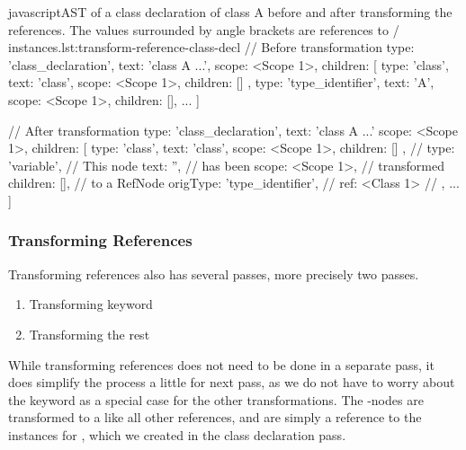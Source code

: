 \begin{code}{javascript}{AST of a class declaration of class A before and after transforming the references. The values surrounded by angle brackets are references to / instances.}{lst:transform-reference-class-decl}
    // Before transformation
    {
        type: 'class_declaration',
        text: 'class A ...',
        scope: <Scope 1>,
        children: [
            {
                type: 'class',
                text: 'class',
                scope: <Scope 1>,
                children: []
            }, {
                type: 'type_identifier',
                text: 'A',
                scope: <Scope 1>,
                children: [],
            }
            ...
        ]
    }

    // After transformation
    {
        type: 'class_declaration',
        text: 'class A ...'
        scope: <Scope 1>,
        children: [
            {
                type: 'class',
                text: 'class',
                scope: <Scope 1>,
                children: []
            }, {                                //
                type: 'variable',               // This node
                text: '',                       // has been
                scope: <Scope 1>,               // transformed
                children: [],                   // to a RefNode
                origType: 'type_identifier',    //
                ref: <Class 1>                  //
            },
            ...
        ]
    }
\end{code}

\subsubsection{Transforming References}

Transforming references also has several passes, more precisely two passes.

\begin{enumerate}
    \item Transforming  keyword
    \item Transforming the rest
\end{enumerate}

While transforming  references does not need to be done in a separate pass, it does simplify the process a little for next pass, as we do not have to worry about the  keyword as a special case for the other transformations.
The -nodes are transformed to a  like all other references, and are simply a reference to the  instances for , which we created in the class declaration pass.

